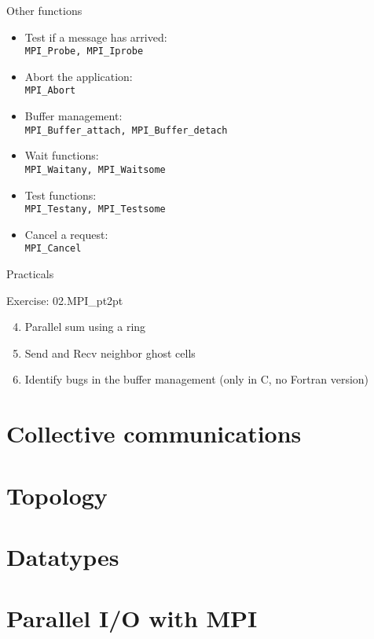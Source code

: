 \documentclass[aspectratio=43]{beamer}
\begin{document}
\begin{frame}[fragile]{Other functions}
\begin{itemize}
    \item Test if a message has arrived:\\\hspace{1cm}\verb+MPI_Probe, MPI_Iprobe+
    \item Abort the application:\\\hspace{1cm}\verb+MPI_Abort+
    \item Buffer management:\\\hspace{1cm}\verb+MPI_Buffer_attach, MPI_Buffer_detach+
    \item Wait functions:\\\hspace{1cm}\verb+MPI_Waitany, MPI_Waitsome+
    \item Test functions:\\\hspace{1cm}\verb+MPI_Testany, MPI_Testsome+
    \item Cancel a request:\\\hspace{1cm}\verb+MPI_Cancel+
\end{itemize}
\end{frame}

\begin{frame}[fragile]{Practicals}
    \begin{brown2block}{Exercise: 02.MPI\_pt2pt}
    \begin{enumerate}
        \setcounter{enumi}{3}
        \item Parallel sum using a ring
        \item Send and Recv neighbor ghost cells
        \item Identify bugs in the buffer management (only in C, no Fortran version)
    \end{enumerate}
    \end{brown2block}
\end{frame}

\section{Collective communications}
\section{Topology}
\section{Datatypes}
\section{Parallel I/O with MPI}

\end{document}
